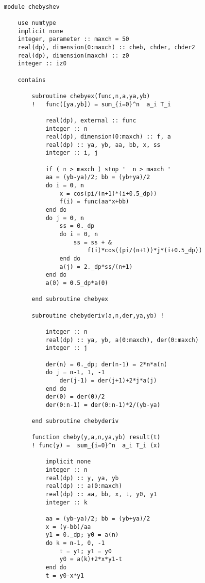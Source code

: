 \documentclass[12pt]{article}
\begin{document}
\begin{lstlisting}[frame=single,caption={Module {\tt cheby.f90}},label=cheby2]

module chebyshev

	use numtype
	implicit none
	integer, parameter :: maxch = 50
	real(dp), dimension(0:maxch) :: cheb, chder, chder2
	real(dp), dimension(maxch) :: z0
	integer :: iz0
	
	contains
        
        subroutine chebyex(func,n,a,ya,yb) 
        !   func([ya,yb]) = sum_{i=0}^n  a_i T_i
    
            real(dp), external :: func
            integer :: n
            real(dp), dimension(0:maxch) :: f, a
            real(dp) :: ya, yb, aa, bb, x, ss
            integer :: i, j
    
            if ( n > maxch ) stop '  n > maxch '
            aa = (yb-ya)/2; bb = (yb+ya)/2
            do i = 0, n
                x = cos(pi/(n+1)*(i+0.5_dp))
                f(i) = func(aa*x+bb)
            end do
            do j = 0, n
                ss = 0._dp
                do i = 0, n
                    ss = ss + &
                        f(i)*cos((pi/(n+1))*j*(i+0.5_dp))
                end do
                a(j) = 2._dp*ss/(n+1)
            end do
            a(0) = 0.5_dp*a(0)
            
        end subroutine chebyex
      
        subroutine chebyderiv(a,n,der,ya,yb) ! 

            integer :: n
            real(dp) :: ya, yb, a(0:maxch), der(0:maxch)
            integer :: j
    
            der(n) = 0._dp; der(n-1) = 2*n*a(n)
            do j = n-1, 1, -1
                der(j-1) = der(j+1)+2*j*a(j)
            end do
            der(0) = der(0)/2
            der(0:n-1) = der(0:n-1)*2/(yb-ya)

        end subroutine chebyderiv
      
        function cheby(y,a,n,ya,yb) result(t) 
        ! func(y) =  sum_{i=0}^n  a_i T_i (x)

            implicit none
            integer :: n
            real(dp) :: y, ya, yb
            real(dp) :: a(0:maxch)
            real(dp) :: aa, bb, x, t, y0, y1
            integer :: k
    
            aa = (yb-ya)/2; bb = (yb+ya)/2
            x = (y-bb)/aa
            y1 = 0._dp; y0 = a(n)
            do k = n-1, 0, -1
                t = y1; y1 = y0
                y0 = a(k)+2*x*y1-t
            end do
            t = y0-x*y1


\end{lstlisting}
\end{document}
